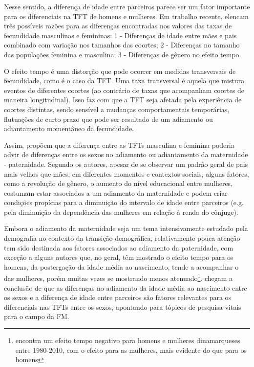 Nesse sentido, a diferença de idade entre parceiros parece ser um fator importante para os diferenciais na TFT de homens e mulheres. Em trabalho recente,  elencam três possíveis razões para as diferenças encontradas nos valores das taxas de fecundidade masculinas e femininas: 1 - Diferenças de idade entre mães e pais combinado com variação nos tamanhos das coortes; 2 - Diferenças no tamanho das populações feminina e masculina; 3 - Diferenças de gênero no efeito tempo.  

O efeito tempo é uma distorção que pode ocorrer em medidas transversais de fecundidade, como é o caso da TFT. Uma taxa transversal é aquela que mistura eventos de diferentes coortes (ao contrário de taxas que acompanham coortes de maneira longitudinal)\cite{FOZ2021metodos}. Isso faz com que a TFT seja afetada pela experiência de coortes distintas, sendo sensível a mudanças comportamentais temporárias, flutuações de curto prazo que pode ser resultado de um adiamento ou adiantamento momentâneo da fecundidade.

Assim,  propõem que a diferença entre as TFTs masculina e feminina poderia advir de diferenças entre os sexos no  adiamento ou adiantamento da maternidade - paternidade. Segundo os autores, apesar de se observar um padrão geral de pais mais velhos que mães, em diferentes momentos e contextos sociais, alguns fatores, como a revolução de gênero, o aumento do nível educacional entre mulheres, costumam estar associados a um adiamento da maternidade e podem criar condições propícias para a diminuição do intervalo de idade entre parceiros (e.g. pela diminuição da dependência das mulheres em relação à renda do cônjuge).

Embora o adiamento da maternidade seja um tema intensivamente estudado pela demografia no contexto da transição demográfica, relativamente pouca atenção tem sido destinada aos fatores associados ao adiamento da paternidade, com exceção a alguns autores \cite{kyzlinkova2018fatherhood,olah2008sweden,office2009patterns,DenmarkNordfalk} que, no geral, têm mostrado o efeito tempo para os homens, da postergação da idade média ao nascimento, tende a acompanhar o das mulheres, porém muitas vezes se mostrando menos atenuado\footnote{ encontra um efeito tempo negativo para homens e mulheres dinamarqueses entre 1980-2010, com o efeito para as mulheres, mais evidente do que para os homens}.  chegam a conclusão de que as diferenças no adiamento da idade média ao nascimento entre os sexos e a diferença de idade entre parceiros são fatores relevantes para os diferenciais nas TFTs entre os sexos, apontando para tópicos de pesquisa vitais para o campo da FM. 

